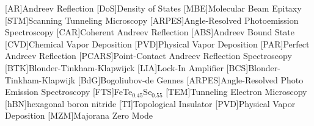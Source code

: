 [AR]{Andreev Reflection}
[DoS]{Density of States}
[MBE]{Molecular Beam Epitaxy}
[STM]{Scanning Tunneling Microscopy}
[ARPES]{Angle-Resolved Photoemission Spectroscopy}
[CAR]{Coherent Andreev Reflection}
[ABS]{Andreev Bound State}
[CVD]{Chemical Vapor Deposition}
[PVD]{Physical Vapor Deposition}
[PAR]{Perfect Andreev Reflection}
[PCARS]{Point-Contact Andreev Reflection Spectroscopy}
[BTK]{Blonder-Tinkham-Klapwijck}
[LIA]{Lock-In Amplifier}
[BCS]{Blonder-Tinkham-Klapwijk}
[BdG]{Bogoliubov-de Gennes}
[ARPES]{Angle-Resolved Photo Emission Spectroscopy}
[FTS]{FeTe$_{0.45}$Se$_{0.55}$}
[TEM]{Tunneling Electron Microscopy}
[hBN]{hexagonal boron nitride}
[TI]{Topological Insulator}
[PVD]{Physical Vapor Deposition}
[MZM]{Majorana Zero Mode}